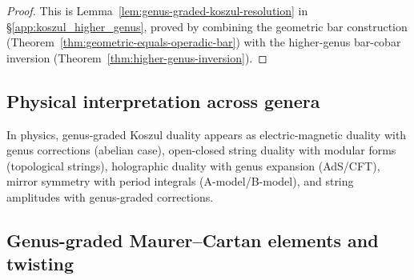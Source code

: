 \begin{proof}
This is Lemma~\ref{lem:genus-graded-koszul-resolution} in
\S\ref{app:koszul_higher_genus}, proved by combining the
geometric bar construction
(Theorem~\ref{thm:geometric-equals-operadic-bar}) with the higher-genus
bar-cobar inversion (Theorem~\ref{thm:higher-genus-inversion}).
\end{proof}

\subsection{Physical interpretation across genera}

In physics, genus-graded Koszul duality appears as electric-magnetic duality with genus corrections (abelian case), open-closed string duality with modular forms (topological strings), holographic duality with genus expansion (AdS/CFT), mirror symmetry with period integrals (A-model/B-model), and string amplitudes with genus-graded corrections.

\subsection{Genus-graded Maurer--Cartan elements and twisting}

